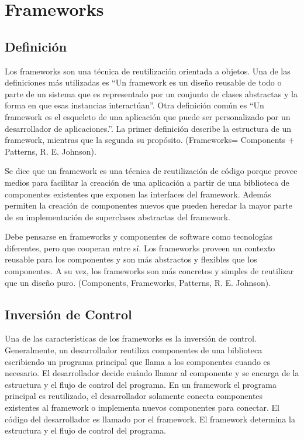 
\section{Frameworks}


\subsection{Definición}


Los frameworks son una técnica de reutilización orientada a objetos.  Una de las
definiciones más utilizadas es ``Un framework es un diseño reusable de todo o
parte de un sistema que es representado por un conjunto de clases abstractas y
la forma en que esas instancias interactúan''. Otra definición común es ``Un
framework es el esqueleto de una aplicación que puede ser personalizado por un
desarrollador de aplicaciones.''. La primer definición describe la estructura de
un framework, mientras que la segunda su propósito. (Frameworks= Components +
Patterns, R. E. Johnson).

Se dice que un framework es una técnica de reutilización de código porque provee
medios para facilitar la creación de una aplicación a partir de una biblioteca
de componentes existentes que exponen las interfaces del framework. Además
permiten la creación de componentes nuevos que pueden heredar la mayor parte de
su implementación de superclases abstractas del framework.


Debe pensarse en frameworks y componentes de software como tecnologías
diferentes, pero que cooperan entre sí. Los frameworks proveen un contexto
reusable para los componentes y son más abstractos y flexibles que los
componentes. A su vez, los frameworks son  más concretos y simples de reutilizar
que un diseño puro. (Components, Frameworks, Patterns, R. E. Johnson).

\subsection{Inversión de Control}
\label{sec:inversion_control}
Una de las características de los frameworks es la inversión de control.
Generalmente, un desarrollador reutiliza componentes de una biblioteca 
escribiendo un programa principal que llama a los componentes cuando es 
necesario. El desarrollador decide cuándo llamar al componente y se encarga de
la estructura y el flujo de control del programa. En un framework el programa
principal es reutilizado, el desarrollador solamente conecta componentes
existentes al framework o implementa nuevos componentes para conectar. El código
del desarrollador es llamado por el framework. El framework determina la estructura
y el flujo de control del programa.

